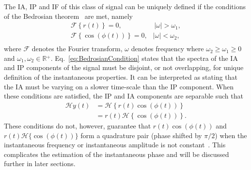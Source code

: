 \documentclass[a4paper]{IEEEtran}
\begin{document}
The IA, IP and IF of this class of signal can be uniquely defined if the conditions of the Bedrosian theorem~\cite{Bedrosian1963} are met, namely
\begin{equation}\label{eq:BedrosianCondition}
\begin{array}{*{20}{c}}
   {\mathcal{F}\left\{ {r\left( t \right)} \right\} = 0,} & {\,\left| \omega \right| > \omega_1,}  \\
   {\mathcal{F}\left\{ {\cos\left(\phi \left( t \right)\right)} \right\} = 0,} & {\left| \omega \right| < \omega_2,}  \\
\end{array}
\end{equation}
where $\mathcal{F}$ denotes the Fourier transform, $\omega$ denotes frequency where $\omega_2 \ge \omega_1 \ge 0$ and $\omega_1,\omega_2 \in \mathbb{R}{^ + }$. Eq.~\ref{eq:BedrosianCondition} states that the spectra of the IA and IP components of the signal must be disjoint, or not overlapping, for unique definition of the instantaneous properties. It can be interpreted as stating that the IA must be varying on a slower time-scale than the IP component. When these conditions are satisfied, the IP and IA components are separable such that
\begin{align}\label{eq:SepAmpandPhase}
   \mathcal{H}y\left( t \right) &= \mathcal{H}\left\{ {r\left( t \right)\cos \left( {\phi \left( t \right)} \right)} \right\} \nonumber \\
   &= r\left( t \right)\mathcal{H}\left\{ {\cos \left( {\phi \left( t \right)} \right)} \right\}.
\end{align}
These conditions do not, however, guarantee that $r\left(t\right)\cos(\phi(t))$ and $r\left(t\right)\mathcal{H}\{\cos(\phi(t))\}$ form a quadrature pair (phase shifted by $\pi/2$) when the instantaneous frequency or instantaneous amplitude is not constant~\cite{Nuttall1966}. This complicates the estimation of the instantaneous phase and will be discussed further in later sections. 
\end{document}
